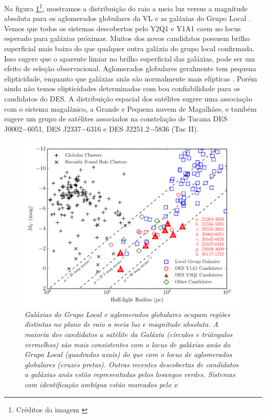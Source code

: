 \documentclass[
	12pt,				%
	openany,			%
	oneside,			%
	a4paper,			%
	english,			%
	brazil				%
	]{abntex2}
\begin{document}
Na figura \ref{fig:localgroup}\footnote{Créditos da imagem \cite{2015arXiv150803622T}}, mostramos a distribuição do raio a meia luz versus a magnitude absoluta para os aglomerados globulares da VL \cite{1998AJ....116.3040G} e as galáxias do Grupo Local \cite{2012AJ....144....4M}. Vemos que todos os sistemas descobertos pelo Y2Q1 e Y1A1 caem no locus esperado para galáxias próximas. Muitos dos novos candidatos possuem brilho superficial mais baixo do que qualquer outra galáxia do grupo local confirmada. Isso sugere que o aparente limiar no brilho superficial das galáxias, pode ser um efeito de seleção observacional. Aglomerados globulares geralmente tem pequena elipticidade, enquanto que galáxias anãs são normalmente mais elípticas \cite{2008MNRAS.390L..51V}. Porém ainda não temos elipticidades determinadas com boa confiabilidade para os candidatos do DES. 
A distribuição espacial dos satélites sugere  uma associação com o sistema magalânico,  a Grande e Pequena nuvem de Magalhães, e também sugere um grupo de satélites associados na constelação de Tucana DES J0002−6051,  DES J2337−6316 e DES J2251.2−5836 (Tuc II). 
\begin{figure}[h]
\begin{center}
\includegraphics[width=12cm]{figuras/localgroup.pdf}
\caption{\textit{Galáxias do Grupo Local e aglomerados globulares ocupam regiões distintas no plano de raio a meia luz e magnitude absoluta. A maioria dos candidatos a satélite da Galáxia (círculos e triângulos vermelhos) são mais consistentes com o locus de galáxias anãs do Grupo Local (quadrados azuis)  do que com o locus de aglomerados globulares (cruzes pretas). Outras recentes descobertas de candidatos a galáxias anãs estão representadas pelos losangos verdes. Sistemas com identificação ambígua estão marcados pelo x \cite{2013ApJ...767..101B, 2015arXiv150802381L}}}

\label{fig:localgroup}
\end{center}
\end{figure}
\vspace{0.5cm}
\end{document}

